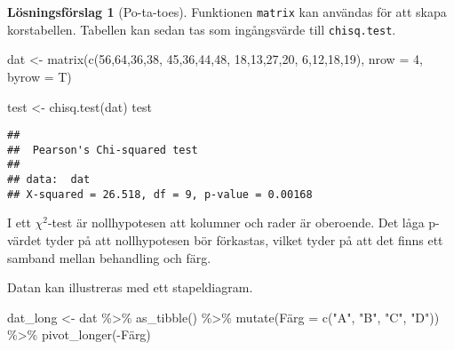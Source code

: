 \documentclass[
]{book}
\newenvironment{Shaded}{\begin{snugshade}}{\end{snugshade}}
\newcommand{\AttributeTok}[1]{\textcolor[rgb]{0.77,0.63,0.00}{#1}}
\newcommand{\DecValTok}[1]{\textcolor[rgb]{0.00,0.00,0.81}{#1}}
\newcommand{\FunctionTok}[1]{\textcolor[rgb]{0.00,0.00,0.00}{#1}}
\newcommand{\NormalTok}[1]{#1}
\newcommand{\OtherTok}[1]{\textcolor[rgb]{0.56,0.35,0.01}{#1}}
\newcommand{\SpecialCharTok}[1]{\textcolor[rgb]{0.00,0.00,0.00}{#1}}
\newcommand{\StringTok}[1]{\textcolor[rgb]{0.31,0.60,0.02}{#1}}
\theoremstyle{definition}
\theoremstyle{definition}
\theoremstyle{definition}
\theoremstyle{definition}
\newtheorem{hypothesis}{Lösningsförslag}[chapter]
\theoremstyle{remark}
\begin{document}
\begin{hypothesis}[Po-ta-toes]

Funktionen \texttt{matrix} kan användas för att skapa korstabellen. Tabellen kan sedan tas som ingångsvärde till \texttt{chisq.test}.

\begin{Shaded}
\begin{Highlighting}[]
\NormalTok{dat }\OtherTok{\textless{}{-}} \FunctionTok{matrix}\NormalTok{(}\FunctionTok{c}\NormalTok{(}\DecValTok{56}\NormalTok{,}\DecValTok{64}\NormalTok{,}\DecValTok{36}\NormalTok{,}\DecValTok{38}\NormalTok{,}
                \DecValTok{45}\NormalTok{,}\DecValTok{36}\NormalTok{,}\DecValTok{44}\NormalTok{,}\DecValTok{48}\NormalTok{,}
                \DecValTok{18}\NormalTok{,}\DecValTok{13}\NormalTok{,}\DecValTok{27}\NormalTok{,}\DecValTok{20}\NormalTok{,}
                \DecValTok{6}\NormalTok{,}\DecValTok{12}\NormalTok{,}\DecValTok{18}\NormalTok{,}\DecValTok{19}\NormalTok{),}
              \AttributeTok{nrow =} \DecValTok{4}\NormalTok{, }\AttributeTok{byrow =}\NormalTok{ T)}

\NormalTok{test }\OtherTok{\textless{}{-}} \FunctionTok{chisq.test}\NormalTok{(dat)}
\NormalTok{test}
\end{Highlighting}
\end{Shaded}

\begin{verbatim}
## 
##  Pearson's Chi-squared test
## 
## data:  dat
## X-squared = 26.518, df = 9, p-value = 0.00168
\end{verbatim}

I ett \(\chi^2\)-test är nollhypotesen att kolumner och rader är oberoende. Det låga p-värdet tyder på att nollhypotesen bör förkastas, vilket tyder på att det finns ett samband mellan behandling och färg.

Datan kan illustreras med ett stapeldiagram.

\begin{Shaded}
\begin{Highlighting}[]
\NormalTok{dat\_long }\OtherTok{\textless{}{-}}\NormalTok{ dat }\SpecialCharTok{\%\textgreater{}\%} 
  \FunctionTok{as\_tibble}\NormalTok{() }\SpecialCharTok{\%\textgreater{}\%} 
  \FunctionTok{mutate}\NormalTok{(Färg }\OtherTok{=} \FunctionTok{c}\NormalTok{(}\StringTok{"A"}\NormalTok{, }\StringTok{"B"}\NormalTok{, }\StringTok{"C"}\NormalTok{, }\StringTok{"D"}\NormalTok{)) }\SpecialCharTok{\%\textgreater{}\%} 
  \FunctionTok{pivot\_longer}\NormalTok{(}\SpecialCharTok{{-}}\NormalTok{Färg)}


\end{Highlighting}
\end{Shaded}
\end{hypothesis}
\end{document}
